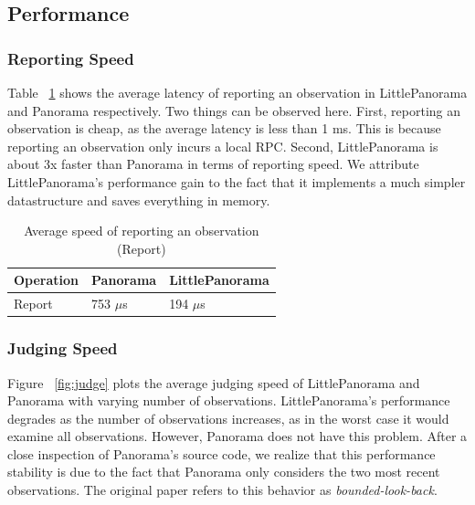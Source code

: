 \subsection{Performance}
\subsubsection{Reporting Speed} Table ~\ref{tab:microbench} shows the average latency of reporting an observation in LittlePanorama and Panorama respectively. Two things can be observed here. First, reporting an observation is cheap, as the average latency is less than 1 ms. This is because reporting an observation only incurs a local RPC. Second, LittlePanorama is about 3x faster than Panorama in terms of reporting speed. We attribute LittlePanorama's performance gain to the fact that it implements a much simpler datastructure and saves everything in memory.

\begin{table}[!tb]
\begin{tabular}{p{}p{}p{}}%

\textbf{Operation} & \textbf{Panorama} & \textbf{LittlePanorama} \\
\midrule
  Report   &    753 $\mu$s  &  194 $\mu$s  \\
\end{tabular}
\vspace{0.5em}
\caption{Average speed of reporting an observation (Report)}
\label{tab:microbench}
\end{table}

\subsubsection{Judging Speed\label{subsubsec:js}} Figure ~\ref{fig:judge} plots the average judging speed of LittlePanorama and Panorama with varying number of observations. LittlePanorama's performance degrades as the number of observations increases, as in the worst case it would examine all observations. However, Panorama does not have this problem. After a close inspection of Panorama's source code, we realize that this performance stability is due to the fact that Panorama only considers the two most recent observations. The original paper refers to this behavior as \textit{bounded-look-back}.

